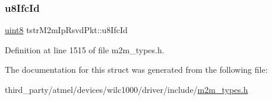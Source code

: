 \subsubsection{\texorpdfstring{u8\+Ifc\+Id}{u8IfcId}}
{\footnotesize\ttfamily \hyperlink{group__DataT_ga4df709a77647e870bbf1d955b8edc9a6}{uint8} tstr\+M2m\+Ip\+Rsvd\+Pkt\+::u8\+Ifc\+Id}



Definition at line 1515 of file m2m\+\_\+types.\+h.



The documentation for this struct was generated from the following file\+:\begin{DoxyCompactItemize}
\item 
third\+\_\+party/atmel/devices/wilc1000/driver/include/\hyperlink{m2m__types_8h}{m2m\+\_\+types.\+h}\end{DoxyCompactItemize}

